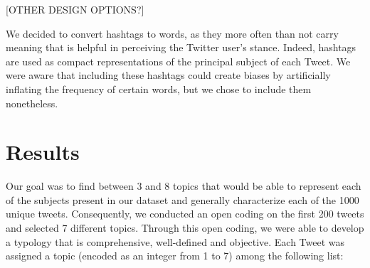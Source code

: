 \documentclass[letterpaper]{article} %
\begin{document}

[OTHER DESIGN OPTIONS?]

We decided to convert hashtags to words, as they more often than not carry meaning that is helpful in perceiving the Twitter user's stance. Indeed, hashtags are used as compact representations of the principal subject of each Tweet. We were aware that including these hashtags could create biases by artificially inflating the frequency of certain words, but we chose to include them nonetheless. 

\section{Results}




Our goal was to find between 3 and 8 topics that would be able to represent each of the subjects present in our dataset and generally characterize each of the 1000 unique tweets. Consequently, we conducted an open coding on the first 200 tweets and selected 7 different topics. Through this open coding, we were able to develop a typology that is comprehensive, well-defined and objective. Each Tweet was assigned a topic (encoded as an integer from 1 to 7) among the following list: 
\end{document}
